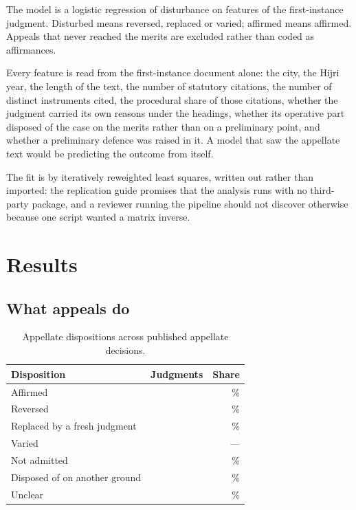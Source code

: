 \documentclass[11pt]{article}
\begin{document}
The model is a logistic regression of disturbance on features of the
first-instance judgment. Disturbed means reversed, replaced or varied;
affirmed means affirmed. Appeals that never reached the merits are excluded
rather than coded as affirmances.

Every feature is read from the first-instance document alone: the city, the
Hijri year, the length of the text, the number of statutory citations, the
number of distinct instruments cited, the procedural share of those
citations, whether the judgment carried its own reasons under the headings,
whether its operative part disposed of the case on the merits rather than on
a preliminary point, and whether a preliminary defence was raised in it. A
model that saw the appellate text would be predicting the outcome from
itself.

The fit is by iteratively reweighted least squares, written out rather than
imported: the replication guide promises that the analysis runs with no
third-party package, and a reviewer running the pipeline should not discover
otherwise because one script wanted a matrix inverse.

\section{Results}
\label{sec:results}

\subsection{What appeals do}

\begin{table}[t]
\centering
\caption{Appellate dispositions across \nAppeals{} published appellate
decisions.}
\label{tab:outcomes}
\begin{tabular}{lrr}
\toprule
Disposition & Judgments & Share \\
\midrule
Affirmed                       & \nAffirmed{}     & \nAffirmedShare{}\% \\
Reversed                       & \nReversed{}     & \nReversedShare{}\% \\
Replaced by a fresh judgment   & \nSubstituted{}  & \nSubstitutedShare{}\% \\
Varied                         & \nVaried{}       & --- \\
Not admitted                   & \nNotAdmitted{}  & \nNotAdmittedShare{}\% \\
Disposed of on another ground  & \nOtherDisposition{} & \nOtherShare{}\% \\
Unclear                        & \nUnclearOutcome{}   & \nUnclearShare{}\% \\
\bottomrule
\end{tabular}
\end{table}
\end{document}
